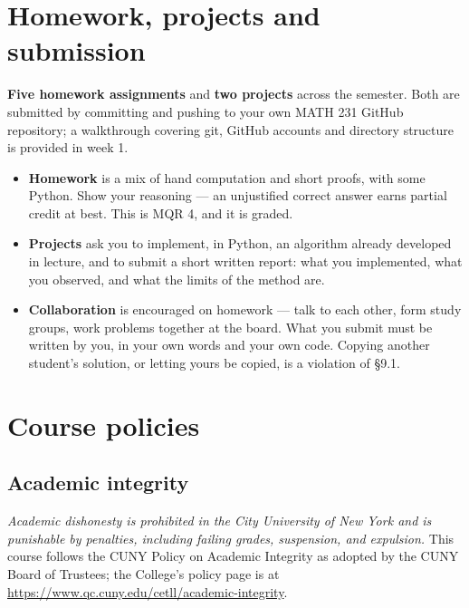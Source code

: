 \documentclass[11pt]{article}
\begin{document}
\section{Homework, projects and submission}

\textbf{Five homework assignments} and \textbf{two projects} across the
semester. Both are submitted by committing and pushing to your own MATH 231
GitHub repository; a walkthrough covering git, GitHub accounts and directory
structure is provided in week 1.

\begin{itemize}
  \item \textbf{Homework} is a mix of hand computation and short proofs, with
        some Python. Show your reasoning --- an unjustified correct answer
        earns partial credit at best. This is MQR 4, and it is graded.
  \item \textbf{Projects} ask you to implement, in Python, an algorithm already
        developed in lecture, and to submit a short written report: what you
        implemented, what you observed, and what the limits of the method are.
  \item \textbf{Collaboration} is encouraged on homework --- talk to each other,
        form study groups, work problems together at the board. What you submit
        must be written by you, in your own words and your own code. Copying
        another student's solution, or letting yours be copied, is a violation
        of \S9.1.
\end{itemize}

\section{Course policies}

\subsection{Academic integrity}

\emph{Academic dishonesty is prohibited in the City University of New York and
is punishable by penalties, including failing grades, suspension, and
expulsion.} This course follows the CUNY Policy on Academic Integrity as adopted
by the CUNY Board of Trustees; the College's policy page is at
\url{https://www.qc.cuny.edu/cetll/academic-integrity}.
\end{document}
